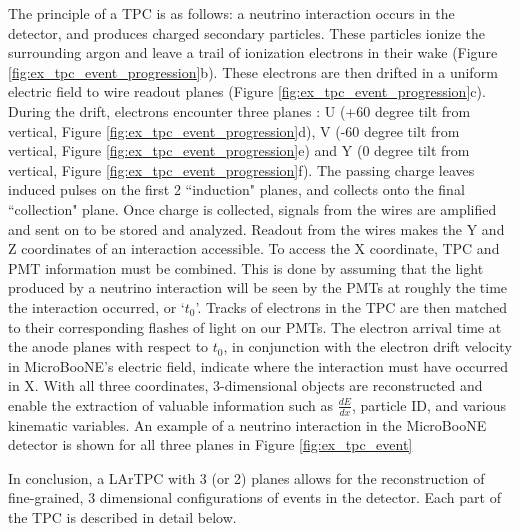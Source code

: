 \par The principle of a TPC is as follows: a neutrino interaction occurs in the detector, and produces charged secondary particles. These particles ionize the surrounding argon and leave a trail of ionization electrons in their wake (Figure \ref{fig:ex_tpc_event_progression}b).  These electrons are then drifted in a uniform electric field to wire readout planes (Figure \ref{fig:ex_tpc_event_progression}c). During the drift, electrons encounter three planes : U (+60 degree tilt from vertical, Figure \ref{fig:ex_tpc_event_progression}d), V (-60 degree tilt from vertical, Figure \ref{fig:ex_tpc_event_progression}e) and Y (0 degree tilt from vertical, Figure \ref{fig:ex_tpc_event_progression}f).  The passing charge leaves induced pulses on the first 2 ``induction" planes, and collects onto the final ``collection" plane.  Once charge is collected, signals from the wires are amplified and sent on to be stored and analyzed. Readout from the wires makes the Y and Z coordinates of an interaction accessible. To access the X coordinate, TPC and PMT information must be combined. This is done by assuming that the light produced by a neutrino interaction will be seen by the PMTs at roughly the time the interaction occurred, or `$t_0$'. Tracks of electrons in the TPC are then matched to their corresponding flashes of light on our PMTs.  The electron arrival time at the anode planes with respect to $t_0$, in conjunction with the electron drift velocity in MicroBooNE's electric field, indicate where the interaction must have occurred in X. With all three coordinates, 3-dimensional objects are reconstructed and enable the extraction of valuable information such as $\frac{dE}{dx}$, particle ID, and various kinematic variables. An example of a neutrino interaction in the MicroBooNE detector is shown for all three planes in Figure \ref{fig:ex_tpc_event}
\par In conclusion, a LArTPC with 3 (or 2) planes allows for the reconstruction of fine-grained, 3 dimensional configurations of events in the detector. Each part of the TPC is described in detail below.


